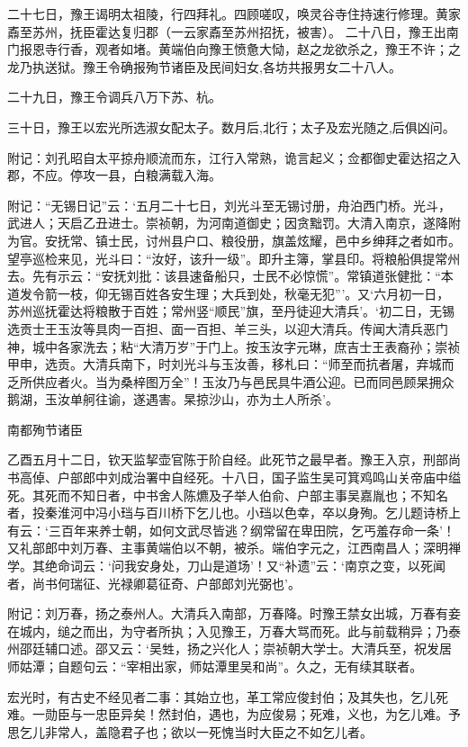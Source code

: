\documentclass[]{article}
\begin{document}
二十七日，豫王谒明太祖陵，行四拜礼。四顾嗟叹，唤灵谷寺住持速行修理。黄家鼒至苏州，抚臣霍达复归郡（一云家鼒至苏州招抚，被害）。
二十八日，豫王出南门报恩寺行香，观者如堵。黄端伯向豫王愤惫大恸，赵之龙欲杀之，豫王不许；之龙乃执送狱。豫王令确报殉节诸臣及民间妇女,各坊共报男女二十八人。

二十九日，豫王令调兵八万下苏、杭。

三十日，豫王以宏光所选淑女配太子。数月后,北行；太子及宏光随之,后俱凶问。

附记：刘孔昭自太平掠舟顺流而东，江行入常熟，诡言起义；佥都御史霍达招之入郡，不应。停攻一县，白粮满载入海。

附记：``无锡日记''云：`五月二十七日，刘光斗至无锡讨册，舟泊西门桥。光斗，武进人；天启乙丑进士。崇祯朝，为河南道御史；因贪黜罚。大清入南京，遂降附为官。安抚常、镇士民，讨州县户口、粮役册，旗盖炫耀，邑中乡绅拜之者如市。望亭巡检来见，光斗曰：``汝好，该升一级''。即升主簿，掌县印。将粮船俱提常州去。先有示云：``安抚刘批：该县速备船只，士民不必惊慌''。常镇道张健批：``本道发令箭一枝，仰无锡百姓各安生理；大兵到处，秋毫无犯'''。又`六月初一日，苏州巡抚霍达将粮散于百姓；常州竖``顺民''旗，至丹徒迎大清兵'。`初二日，无锡选贡士王玉汝等具肉一百担、面一百担、羊三头，以迎大清兵。传闻大清兵恶门神，城中各家洗去；粘``大清万岁''于门上。按玉汝字元琳，庶吉士王表裔孙；崇祯甲申，选贡。大清兵南下，时刘光斗与玉汝善，移札曰：``师至而抗者屠，弃城而乏所供应者火。当为桑梓图万全''！玉汝乃与邑民具牛酒公迎。已而同邑顾杲拥众鹅湖，玉汝单舸往谕，遂遇害。杲掠沙山，亦为土人所杀'。

南都殉节诸臣

乙酉五月十二日，钦天监挈壶官陈于阶自经。此死节之最早者。豫王入京，刑部尚书高倬、户部郎中刘成治署中自经死。十八日，国子监生吴可箕鸡鸣山关帝庙中缢死。其死而不知日者，中书舍人陈爊及子举人伯俞、户部主事吴嘉胤也；不知名者，投秦淮河中冯小珰与百川桥下乞儿也。小珰以色幸，卒以身殉。乞儿题诗桥上有云：`三百年来养士朝，如何文武尽皆逃？纲常留在卑田院，乞丐羞存命一条'！又礼部郎中刘万春、主事黄端伯以不朝，被杀。端伯字元之，江西南昌人；深明禅学。其绝命词云：`问我安身处，刀山是道场'！又``补遗''云：`南京之变，以死闻者，尚书何瑞征、光禄卿葛征奇、户部郎刘光弼也'。

附记：刘万春，扬之泰州人。大清兵入南部，万春降。时豫王禁女出城，万春有妾在城内，缒之而出，为守者所执；入见豫王，万春大骂而死。此与前载稍异；乃泰州邵廷辅口述。邵又云：`吴甡，扬之兴化人；崇祯朝大学士。大清兵至，祝发居师姑潭；自题句云：``宰相出家，师姑潭里吴和尚''。久之，无有续其联者。

宏光时，有古史不经见者二事：其始立也，革工常应俊封伯；及其失也，乞儿死难。一勋臣与一忠臣异矣！然封伯，遇也，为应俊易；死难，义也，为乞儿难。予思乞儿非常人，盖隐君子也；欲以一死愧当时大臣之不如乞儿者。
\end{document}
